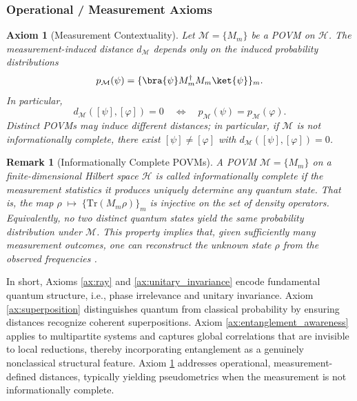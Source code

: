 \documentclass[aps,pra,reprint,nofootinbib,showpacs,superscriptaddress]{revtex4-1}
\newtheorem{axiom}{Axiom}[section]
\newtheorem{remark}[theorem]{Remark}
\newcommand{\Hilbert}{\mathcal{H}}
\begin{document}
\subsubsection{Operational / Measurement Axioms}

 \begin{axiom}[Measurement Contextuality]
\label{ax:measurement_contextuality}
Let $\mathcal{M} = \{M_m\}$ be a POVM on $\Hilbert$. 
The measurement-induced distance $d_\mathcal{M}$ depends only on the induced probability distributions
\[
p_\mathcal{M}(\psi) = \{\bra{\psi} M_m^\dagger M_m \ket{\psi}\}_m.
\]
In particular,
\[
d_\mathcal{M}([\psi],[\varphi]) = 0 
\quad \Longleftrightarrow \quad 
p_\mathcal{M}(\psi) = p_\mathcal{M}(\varphi).
\]
Distinct POVMs may induce different distances; in particular, if $\mathcal{M}$ is not informationally complete, there exist $[\psi] \neq [\varphi]$ with $d_\mathcal{M}([\psi],[\varphi]) = 0$.
\end{axiom}

\begin{remark}[Informationally Complete POVMs]
A POVM $\mathcal{M} = \{M_m\}$ on a finite-dimensional Hilbert space $\Hilbert$ is called \emph{informationally complete} if the measurement statistics it produces uniquely determine any quantum state. That is, the map
\(
\rho \;\mapsto\; \{ \mathrm{Tr}(M_m \rho) \}_m
\)
is injective on the set of density operators. Equivalently, no two distinct quantum states yield the same probability distribution under $\mathcal{M}$. This property implies that, given sufficiently many measurement outcomes, one can \emph{reconstruct} the unknown state $\rho$ from the observed frequencies \cite{nielsen2010quantum}.
\end{remark}



\noindent In short, Axioms \ref{ax:ray} and \ref{ax:unitary_invariance} encode fundamental quantum structure, i.e., phase irrelevance and unitary invariance. 
Axiom \ref{ax:superposition} distinguishes quantum from classical probability by ensuring distances recognize coherent superpositions. 
Axiom \ref{ax:entanglement_awareness} applies to multipartite systems and captures global correlations that are invisible to local reductions, thereby incorporating entanglement as a genuinely nonclassical structural feature. 
Axiom \ref{ax:measurement_contextuality} addresses operational, measurement-defined distances, typically yielding pseudometrics when the measurement is not informationally complete. 
\end{document}
